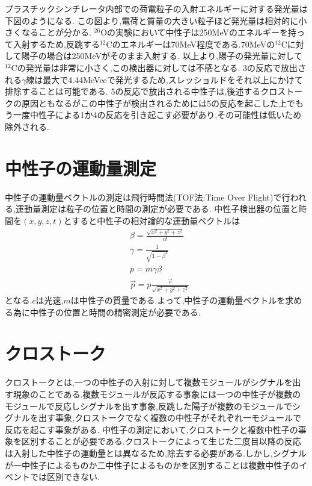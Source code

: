\documentclass[dvipdfmx]{jsreport}
\begin{document}
プラスチックシンチレータ内部での荷電粒子の入射エネルギーに対する発光量は下図のようになる.
この図より,電荷と質量の大きい粒子ほど発光量は相対的に小さくなることが分かる.
$^26$Oの実験において中性子は250MeVのエネルギーを持って入射するため,反跳する$^{12}\mathrm{C}$のエネルギーは70MeV程度である.70MeVの$^{12}\mathrm{C}$に対して陽子の場合は250MeVがそのまま入射する.
以上より,陽子の発光量に対して$^{12}\mathrm{C}$の発光量は非常に小さく,この検出器に対しては不感となる.
3の反応で放出される$\gamma$線は最大で4.44MeVeeで発光するため,スレッショルドをそれ以上にかけて排除することは可能である.
5の反応で放出される中性子は,後述するクロストークの原因ともなるがこの中性子が検出されるためには5の反応を起こした上でもう一度中性子による1か4の反応を引き起こす必要があり,その可能性は低いため除外される.
\section{中性子の運動量測定}
中性子の運動量ベクトルの測定は飛行時間法(TOF法:Time Over Flight)で行われる,運動量測定は粒子の位置と時間の測定が必要である.
中性子検出器の位置と時間を$(x,y,z,t)$とすると中性子の相対論的な運動量ベクトルは
\begin{equation}\begin{split}&\beta=\frac{\sqrt{x^2+y^2+z^2}}{ct}\\&\gamma=\frac{1}{\sqrt{1-\beta^2}}\\&p=m\gamma\beta\\&\vec{p}=p\frac{\vec{r}}{\sqrt{x^2+y^2+z^2}}\end{split}\end{equation}
となる.$c$は光速,$m$は中性子の質量である.よって,中性子の運動量ベクトルを求める為に中性子の位置と時間の精密測定が必要である.

\section{クロストーク}
クロストークとは,一つの中性子の入射に対して複数モジュールがシグナルを出す現象のことである.複数モジュールが反応する事象には一つの中性子が複数のモジュールで反応しシグナルを出す事象,反跳した陽子が複数のモジュールでシグナルを出す事象,クロストークでなく複数の中性子がそれぞれ一モジュールで反応を起こす事象がある.
中性子の測定において,クロストークと複数中性子の事象を区別することが必要である.クロストークによって生じた二度目以降の反応は入射した中性子の運動量とは異なるため,除去する必要がある.しかし,シグナルが一中性子によるものか二中性子によるものかを区別することは複数中性子のイベントでは区別できない.\\
\end{document}
